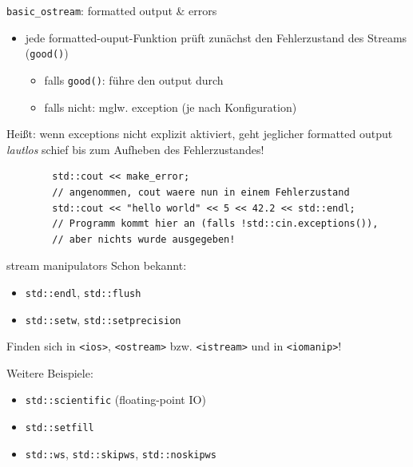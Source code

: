 \begin{frame}[fragile]{\texttt{basic\_ostream}: formatted output \& errors}
	\begin{itemize}
		\item jede formatted-ouput-Funktion prüft zunächst den Fehlerzustand des Streams (\texttt{good()})
		\begin{itemize}
			\item falls \texttt{good()}: führe den output durch
			\item falls nicht: mglw. exception (je nach Konfiguration)
		\end{itemize}
	\end{itemize}
	
	\pause
	\vspace{2em}
	
	Heißt: wenn exceptions nicht explizit aktiviert, geht jeglicher formatted output \emph{lautlos} schief bis zum Aufheben des Fehlerzustandes!
	
	\begin{lstlisting}
		std::cout << make_error;
		// angenommen, cout waere nun in einem Fehlerzustand
		std::cout << "hello world" << 5 << 42.2 << std::endl;
		// Programm kommt hier an (falls !std::cin.exceptions()),
		// aber nichts wurde ausgegeben!
	\end{lstlisting}
\end{frame}

\begin{frame}{stream manipulators}
	Schon bekannt:
	\begin{itemize}
		\item \texttt{std::endl}, \texttt{std::flush}
		\item \texttt{std::setw}, \texttt{std::setprecision}
	\end{itemize}
	
	\vspace{1em}
	
	Finden sich in \texttt{<ios>}, \texttt{<ostream>} bzw. \texttt{<istream>} und in \texttt{<iomanip>}!
	
	\vspace{1em}
	
	Weitere Beispiele:
	\begin{itemize}
		\item \texttt{std::scientific} (floating-point IO)
		\item \texttt{std::setfill}
		\item \texttt{std::ws}, \texttt{std::skipws}, \texttt{std::noskipws}
	\end{itemize}
\end{frame}

